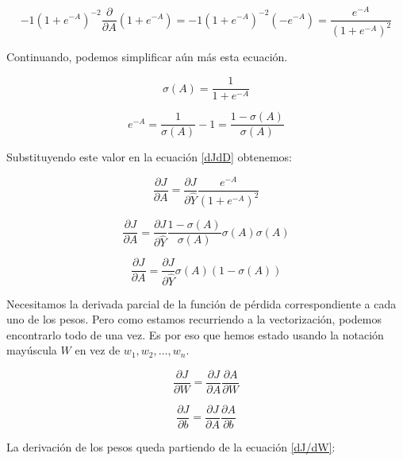 \documentclass[14.5pt,a4paper]{article}
\begin{document}
\begin{equation}
 -1  (1+e^{-A})^{-2} \frac{\partial}{\partial A} (1+e^{-A}) = -1  (1+e^{-A})^{-2} (-e^{-A}) = \frac{e^{-A}}{(1+e^{-A})^2}
\end{equation}

Continuando, podemos simplificar aún más esta ecuación.

\begin{equation}
\sigma(A) = \frac{1}{1+e^{-A}}
\end{equation}

\begin{equation}
e^{-A} = \frac{1}{\sigma (A)} - 1 = \frac{1-\sigma (A)}{\sigma(A)}
\end{equation}

Substituyendo este valor en la ecuación \ref{dJdD} obtenemos:

\begin{equation}
\frac{\partial J}{\partial A} = \frac{\partial J}{\partial \hat{Y}} \frac{e^{-A}}{(1+e^{-A})^2}
\end{equation}

\begin{equation}
\frac{\partial J}{\partial A} = \frac{\partial J} {\partial \hat{Y} } \frac{1-\sigma(A)}{\sigma(A)} \sigma (A) \sigma (A)
\end{equation}

\begin{equation}
\frac{\partial J}{\partial A} = \frac{\partial J} {\partial \hat{Y}} \sigma(A) (1-\sigma(A))
\end{equation}

Necesitamos la derivada parcial de la función de pérdida correspondiente a cada uno de los pesos. Pero como estamos recurriendo a la vectorización, podemos encontrarlo todo de una vez. Es por eso que hemos estado usando la notación mayúscula $W$ en vez de $w_1, w_2, \ldots, w_n$.

\begin{equation}
\frac{\partial J}{\partial W} = \frac{\partial J}{\partial A} \frac{\partial A}{\partial W}
\label{dJ/dW}
\end{equation}

\begin{equation}
\frac{\partial J}{\partial b} = \frac{\partial J}{\partial A} \frac{\partial A}{\partial b}
\label{dJ/db}
\end{equation}

La derivación de los pesos queda partiendo de la ecuación \ref{dJ/dW}:
\end{document}
